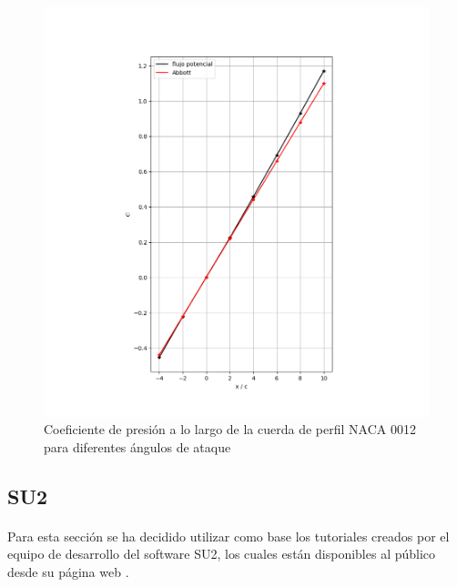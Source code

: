 \documentclass[letterpaper, openright, 12pt]{book}
\begin{document}
    \begin{figure}[H]%
        \centering
        \includegraphics[keepaspectratio,
            width=138mm]{./Imagenes/potential_flow_cl}
        \caption[Coeficiente de presión a lo largo de la cuerda de perfil NACA 0012]
        {Coeficiente de presión a lo largo de la cuerda de perfil NACA 0012 para
            diferentes ángulos de ataque}
        \label{fig:potential_flow_cl}
    \end{figure}


    \subsection{SU2}
    \paragraph*{}
    Para esta sección se ha decidido utilizar como base los tutoriales creados
    por el equipo de desarrollo del software SU2, los cuales están disponibles
    al público desde su página web \cite{SU2}.
\end{document}
